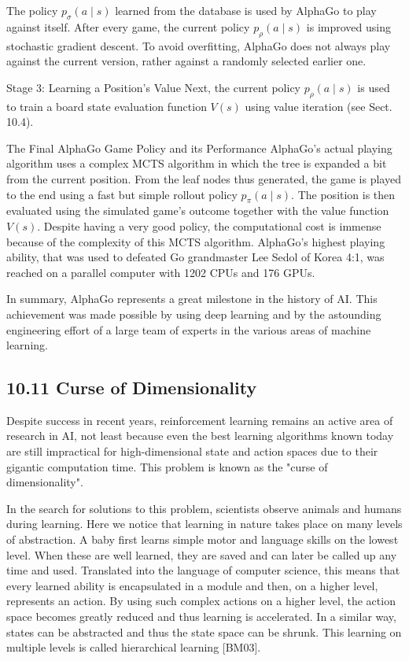 \documentclass[10pt]{book}
\begin{document}
\begin{center}
\begin{enumerate}
\begin{center}
\begin{center}
\begin{center}
\begin{center}
\begin{center}
The policy $p_{\sigma}(a \mid s)$ learned from the database is used by AlphaGo to play against itself. After every game, the current policy $p_{\rho}(a \mid s)$ is improved using stochastic gradient descent. To avoid overfitting, AlphaGo does not always play against the current version, rather against a randomly selected earlier one.

Stage 3: Learning a Position's Value Next, the current policy $p_{\rho}(a \mid s)$ is used to train a board state evaluation function $V(s)$ using value iteration (see Sect. 10.4).

The Final AlphaGo Game Policy and its Performance AlphaGo's actual playing algorithm uses a complex MCTS algorithm in which the tree is expanded a bit from the current position. From the leaf nodes thus generated, the game is played to the end using a fast but simple rollout policy $p_{\pi}(a \mid s)$. The position is then evaluated using the simulated game's outcome together with the value function $V(s)$. Despite having a very good policy, the computational cost is immense because of the complexity of this MCTS algorithm. AlphaGo's highest playing ability, that was used to defeated Go grandmaster Lee Sedol of Korea 4:1, was reached on a parallel computer with 1202 CPUs and 176 GPUs.

In summary, AlphaGo represents a great milestone in the history of AI. This achievement was made possible by using deep learning and by the astounding engineering effort of a large team of experts in the various areas of machine learning.

\subsection*{10.11 Curse of Dimensionality}
Despite success in recent years, reinforcement learning remains an active area of research in AI, not least because even the best learning algorithms known today are still impractical for high-dimensional state and action spaces due to their gigantic computation time. This problem is known as the "curse of dimensionality".

In the search for solutions to this problem, scientists observe animals and humans during learning. Here we notice that learning in nature takes place on many levels of abstraction. A baby first learns simple motor and language skills on the lowest level. When these are well learned, they are saved and can later be called up any time and used. Translated into the language of computer science, this means that every learned ability is encapsulated in a module and then, on a higher level, represents an action. By using such complex actions on a higher level, the action space becomes greatly reduced and thus learning is accelerated. In a similar way, states can be abstracted and thus the state space can be shrunk. This learning on multiple levels is called hierarchical learning [BM03].


\end{center}
\end{center}
\end{center}
\end{center}
\end{center}
\end{enumerate}
\end{center}
\end{document}
